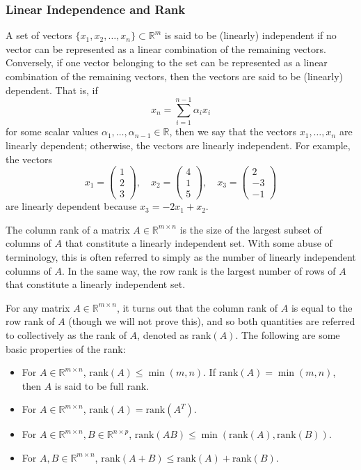 \subsubsection{Linear Independence and Rank}
A set of vectors $\{x_1, x_2, \ldots, x_n\} \subset \mathbb{R}^m$ is said to be (linearly) independent if no vector can be represented as a linear combination of the remaining vectors. Conversely, if one vector belonging to the set can be represented as a linear combination of the remaining vectors, then the vectors are said to be (linearly) dependent. That is, if
\[
x_n = \sum_{i=1}^{n-1} \alpha_i x_i
\]
for some scalar values $\alpha_1, \ldots, \alpha_{n-1} \in \mathbb{R}$, then we say that the vectors $x_1, \ldots, x_n$ are linearly dependent; otherwise, the vectors are linearly independent. For example, the vectors
\[
x_1 = \begin{pmatrix} 1 \\ 2 \\ 3 \end{pmatrix}, \quad
x_2 = \begin{pmatrix} 4 \\ 1 \\ 5 \end{pmatrix}, \quad
x_3 = \begin{pmatrix} 2 \\ -3 \\ -1 \end{pmatrix}
\]
are linearly dependent because $x_3 = -2x_1 + x_2$.

The column rank of a matrix $A \in \mathbb{R}^{m\times n}$ is the size of the largest subset of columns of $A$ that constitute a linearly independent set. With some abuse of terminology, this is often referred to simply as the number of linearly independent columns of $A$. In the same way, the row rank is the largest number of rows of $A$ that constitute a linearly independent set.

For any matrix $A \in \mathbb{R}^{m\times n}$, it turns out that the column rank of $A$ is equal to the row rank of $A$ (though we will not prove this), and so both quantities are referred to collectively as the rank of $A$, denoted as $\text{rank}(A)$. The following are some basic properties of the rank:

\begin{itemize}
    \item For $A \in \mathbb{R}^{m\times n}$, $\text{rank}(A) \leq \min(m,n)$. If $\text{rank}(A) = \min(m,n)$, then $A$ is said to be full rank.
    \item For $A \in \mathbb{R}^{m\times n}$, $\text{rank}(A) = \text{rank}(A^T)$.
    \item For $A \in \mathbb{R}^{m\times n}, B \in \mathbb{R}^{n\times p}$, $\text{rank}(AB) \leq \min(\text{rank}(A), \text{rank}(B))$.
    \item For $A, B \in \mathbb{R}^{m\times n}$, $\text{rank}(A + B) \leq \text{rank}(A) + \text{rank}(B)$.
\end{itemize}


